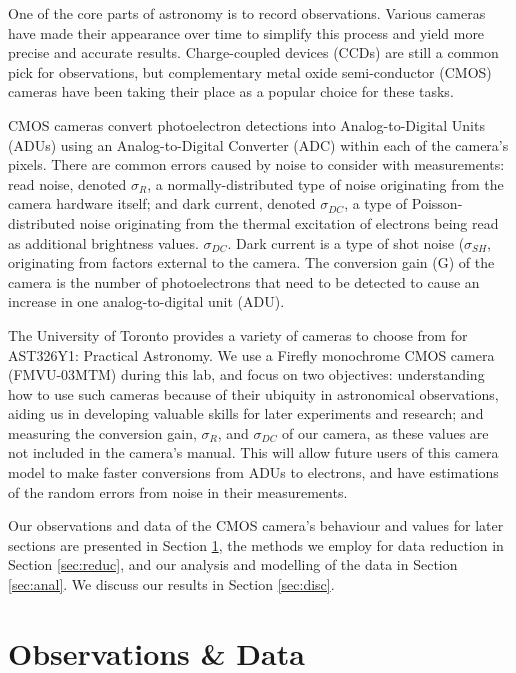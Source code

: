 \documentclass[preprint2]{aastex702}
\begin{document}
			One of the core parts of astronomy is to record observations. Various cameras have made their appearance over time to simplify this process and yield more precise and accurate results. Charge-coupled devices (CCDs) are still a common pick for observations, but complementary metal oxide semi-conductor (CMOS) cameras have been taking their place as a popular choice for these tasks.

			CMOS cameras convert photoelectron detections into Analog-to-Digital Units (ADUs) using an Analog-to-Digital Converter (ADC) within each of the camera's pixels. There are common errors caused by noise to consider with measurements: read noise, denoted $\sigma_R$, a normally-distributed type of noise originating from the camera hardware itself; and dark current, denoted $\sigma_{DC}$, a type of Poisson-distributed noise originating from the thermal excitation of electrons being read as additional brightness values. $\sigma_{DC}$. Dark current is a type of shot noise ($\sigma_{SH}$, originating from factors external to the camera. The conversion gain (G) of the camera is the number of photoelectrons that need to be detected to cause an increase in one analog-to-digital unit (ADU).

			The University of Toronto provides a variety of cameras to choose from for AST326Y1: Practical Astronomy. We use a Firefly monochrome CMOS camera (FMVU-03MTM) during this lab, and focus on two objectives: understanding how to use such cameras because of their ubiquity in astronomical observations, aiding us in developing valuable skills for later experiments and research; and measuring the conversion gain, $\sigma_R$, and $\sigma_{DC}$ of our camera, as these values are not included in the camera's manual. This will allow future users of this camera model to make faster conversions from ADUs to electrons, and have estimations of the random errors from noise in their measurements.

			Our observations and data of the CMOS camera's behaviour and values for later sections are presented in Section \ref{sec:obs}, the methods we employ for data reduction in Section \ref{sec:reduc}, and our analysis and modelling of the data in Section \ref{sec:anal}. We discuss our results in Section \ref{sec:disc}. 

    \section{Observations \& Data}\label{sec:obs}
\end{document}
